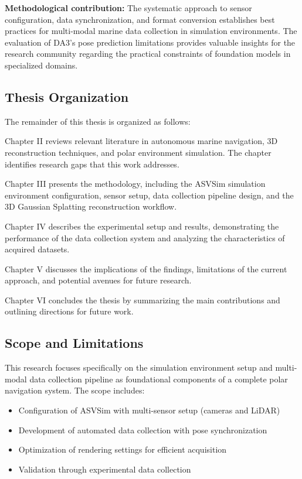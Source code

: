 \textbf{Methodological contribution:} The systematic approach to sensor configuration, data synchronization, and format conversion establishes best practices for multi-modal marine data collection in simulation environments. The evaluation of DA3's pose prediction limitations provides valuable insights for the research community regarding the practical constraints of foundation models in specialized domains.

\subsection{Thesis Organization}

The remainder of this thesis is organized as follows:

Chapter II reviews relevant literature in autonomous marine navigation, 3D reconstruction techniques, and polar environment simulation. The chapter identifies research gaps that this work addresses.

Chapter III presents the methodology, including the ASVSim simulation environment configuration, sensor setup, data collection pipeline design, and the 3D Gaussian Splatting reconstruction workflow.

Chapter IV describes the experimental setup and results, demonstrating the performance of the data collection system and analyzing the characteristics of acquired datasets.

Chapter V discusses the implications of the findings, limitations of the current approach, and potential avenues for future research.

Chapter VI concludes the thesis by summarizing the main contributions and outlining directions for future work.

\subsection{Scope and Limitations}

This research focuses specifically on the simulation environment setup and multi-modal data collection pipeline as foundational components of a complete polar navigation system. The scope includes:

\begin{itemize}
    \item Configuration of ASVSim with multi-sensor setup (cameras and LiDAR)
    \item Development of automated data collection with pose synchronization
    \item Optimization of rendering settings for efficient acquisition
    \item Validation through experimental data collection
\end{itemize}

